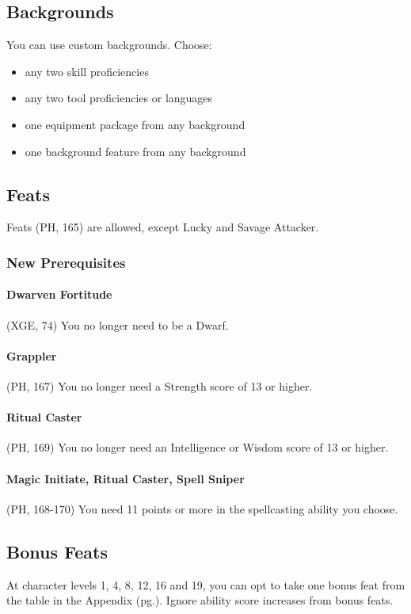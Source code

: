 \documentclass[letterpaper,twocolumn,openany,nodeprecatedcode]{dndbook}
\newcommand{\pg}[1]{pg.\pageref{#1}}
\begin{document}
\subsection{Backgrounds}
You can use custom backgrounds. Choose:
\begin{itemize}
\item any two skill proficiencies 
\item any two tool proficiencies or languages 
\item one equipment package from any background
\item one background feature from any background
\end{itemize}

\subsection{Feats}
Feats (PH, 165) are allowed, except Lucky and Savage Attacker.

\subsubsection{New Prerequisites}

\paragraph{Dwarven Fortitude} (XGE, 74) You no longer need to be a Dwarf.

\paragraph{Grappler} (PH, 167) You no longer need a Strength score of 13 or higher.

\paragraph{Ritual Caster} (PH, 169) You no longer need an Intelligence or Wisdom score of 13 or higher.

\paragraph{Magic Initiate, Ritual Caster, Spell Sniper} (PH, 168-170) You need 11 points or more in the spellcasting ability you choose.



\label{gameplay-feats-bonus}
\subsection{Bonus Feats}
At character levels 1, 4, 8, 12, 16 and 19, you can opt to take one bonus feat from the table in the Appendix (\pg{bonus-feats-table}). Ignore ability score increases from bonus feats.
\end{document}
